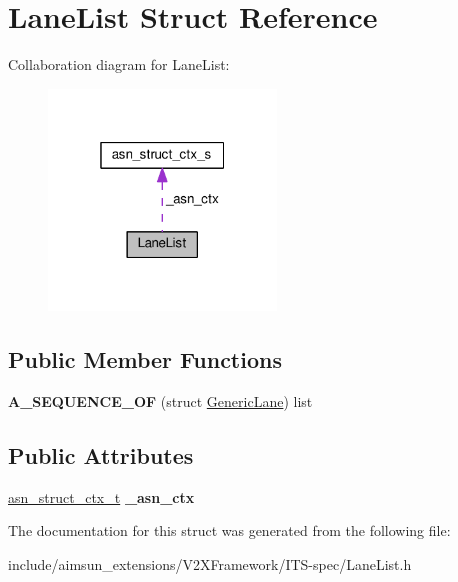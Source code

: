 \hypertarget{structLaneList}{}\section{Lane\+List Struct Reference}
\label{structLaneList}


Collaboration diagram for Lane\+List\+:\nopagebreak
\begin{figure}[H]
\begin{center}
\leavevmode
\includegraphics[width=172pt]{structLaneList__coll__graph}
\end{center}
\end{figure}
\subsection*{Public Member Functions}
\begin{DoxyCompactItemize}
\item 
{\bfseries A\+\_\+\+S\+E\+Q\+U\+E\+N\+C\+E\+\_\+\+OF} (struct \hyperlink{structGenericLane}{Generic\+Lane}) list\hypertarget{structLaneList_a808a826a71297e66a4ad7f610b655712}{}\label{structLaneList_a808a826a71297e66a4ad7f610b655712}

\end{DoxyCompactItemize}
\subsection*{Public Attributes}
\begin{DoxyCompactItemize}
\item 
\hyperlink{structasn__struct__ctx__s}{asn\+\_\+struct\+\_\+ctx\+\_\+t} {\bfseries \+\_\+asn\+\_\+ctx}\hypertarget{structLaneList_af026c16f3d8100e446c601cc42af6b6e}{}\label{structLaneList_af026c16f3d8100e446c601cc42af6b6e}

\end{DoxyCompactItemize}


The documentation for this struct was generated from the following file\+:\begin{DoxyCompactItemize}
\item 
include/aimsun\+\_\+extensions/\+V2\+X\+Framework/\+I\+T\+S-\/spec/Lane\+List.\+h\end{DoxyCompactItemize}
